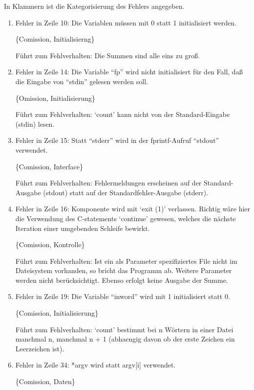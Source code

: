 
In Klammern ist die Kategorisierung des Fehlers angegeben.

\begin{enumerate}


\item Fehler in Zeile 10: 
Die Variablen m\"ussen mit 0 statt 1 initialisiert werden.

\{Comission, Initialisierng\} 

F\"uhrt zum Fehlverhalten:
Die Summen sind alle eins zu gro{\ss}.

\item Fehler in Zeile 14: Die Variable ``fp'' wird nicht initialisiert f\"ur den
Fall, da{\ss} die Eingabe von ``stdin'' gelesen werden soll.

\{Omission, Initialisierung\} 

F\"uhrt zum Fehlverhalten:
`count' kann nicht von der Standard-Eingabe (stdin) lesen.


\item Fehler in Zeile 15: Statt ``stderr'' wird in der fprintf-Aufruf
``stdout'' verwendet.

\{Comission, Interface\} 

F\"uhrt zum Fehlverhalten:
Fehlermeldungen erscheinen auf der Standard-Ausgabe (stdout) 
statt auf der Standardfehler-Ausgabe (stderr).


\item Fehler in Zeile 16: Komponente wird mit `exit (1)'
verlassen. Richtig w\"are hier die Verwendung des C-statements
`continue' gewesen, welches die n\"achste Iteration einer umgebenden
Schleife bewirkt.  

\{Comission, Kontrolle\}

F\"uhrt zum Fehlverhalten:
Ist ein als Parameter spezifiziertes File nicht im Dateisystem
vorhanden, so bricht das Programm ab.  Weitere Parameter werden nicht
ber\"ucksichtigt. Ebenso erfolgt keine Ausgabe der Summe.


\item Fehler in Zeile 19: Die Variable ``inword'' wird mit 1
initialisiert statt 0.

 \{Comission, Initialisierung\}

F\"uhrt zum Fehlverhalten:
`count' bestimmt bei n W\"ortern in einer Datei manchmal n,
manchmal n + 1 (abhaengig davon ob der erste Zeichen ein Leerzeichen
ist).  


\item Fehler in Zeile 34: *argv wird statt argv[i] verwendet.

\{Comission, Daten\}


\end{enumerate}
